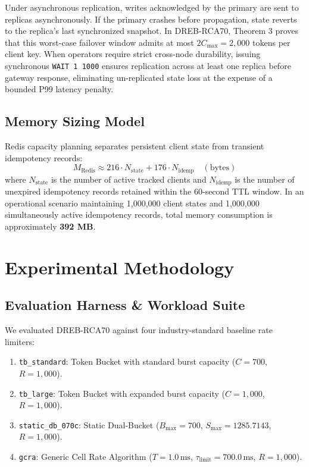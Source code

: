 \documentclass[conference]{IEEEtran}
\begin{document}
Under asynchronous replication, writes acknowledged by the primary are sent to replicas asynchronously. If the primary crashes before propagation, state reverts to the replica's last synchronized snapshot. In DREB-RCA70, Theorem 3 proves that this worst-case failover window admits at most $2 C_{\max} = 2,000$ tokens per client key. When operators require strict cross-node durability, issuing synchronous \texttt{WAIT 1 1000} ensures replication across at least one replica before gateway response, eliminating un-replicated state loss at the expense of a bounded P99 latency penalty.

\subsection{Memory Sizing Model}
Redis capacity planning separates persistent client state from transient idempotency records:
\begin{equation}
M_{\text{Redis}} \approx 216 \cdot N_{\text{state}} + 176 \cdot N_{\text{idemp}} \quad (\text{bytes})
\end{equation}
where $N_{\text{state}}$ is the number of active tracked clients and $N_{\text{idemp}}$ is the number of unexpired idempotency records retained within the 60-second TTL window. In an operational scenario maintaining 1,000,000 client states and 1,000,000 simultaneously active idempotency records, total memory consumption is approximately \textbf{392 MB}.

\section{Experimental Methodology}

\subsection{Evaluation Harness \& Workload Suite}
We evaluated DREB-RCA70 against four industry-standard baseline rate limiters:
\begin{enumerate}
    \item \texttt{tb\_standard}: Token Bucket with standard burst capacity ($C = 700$, $R = 1,000$).
    \item \texttt{tb\_large}: Token Bucket with expanded burst capacity ($C = 1,000$, $R = 1,000$).
    \item \texttt{static\_db\_070c}: Static Dual-Bucket ($B_{\max} = 700$, $S_{\max} = 1285.7143$, $R = 1,000$).
    \item \texttt{gcra}: Generic Cell Rate Algorithm ($T = 1.0\,\text{ms}$, $\tau_{\text{limit}} = 700.0\,\text{ms}$, $R = 1,000$).
\end{enumerate}
\end{document}
